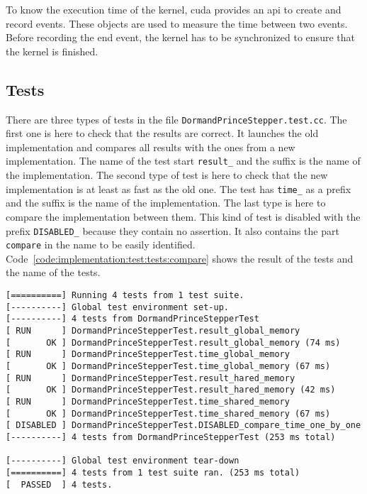 To know the execution time of the kernel, \acrshort{cuda} provides an \acrshort{api}
to create and record events.
These objects are used to measure the time between two events.
Before recording the end event, the kernel has to be synchronized to ensure
that the kernel is finished.

\subsection{Tests}
\label{ch:implementation:test:tests}

There are three types of tests in the file \texttt{DormandPrinceStepper.test.cc}.
The first one is here to check that the results are correct.
It launches the old implementation and compares all results with the ones from a
new implementation.
The name of the test start \texttt{result\_} and the suffix is the name of the
implementation.
The second type of test is here to check that the new implementation is
at least as fast as the old one.
The test has \texttt{time\_} as a prefix and the suffix is the name of the
implementation.
The last type is here to compare the implementation between them.
This kind of test is disabled with the prefix \texttt{DISABLED\_} because
they contain no assertion.
It also contains the part \texttt{compare} in the name to be easily identified.
Code~\ref{code:implementation:test:tests:compare} shows the result of the tests
and the name of the tests.

\begin{code}
    \label{code:implementation:test:tests:compare}
    \begin{verbatim}
[==========] Running 4 tests from 1 test suite.
[----------] Global test environment set-up.
[----------] 4 tests from DormandPrinceStepperTest
[ RUN      ] DormandPrinceStepperTest.result_global_memory
[       OK ] DormandPrinceStepperTest.result_global_memory (74 ms)
[ RUN      ] DormandPrinceStepperTest.time_global_memory
[       OK ] DormandPrinceStepperTest.time_global_memory (67 ms)
[ RUN      ] DormandPrinceStepperTest.result_hared_memory
[       OK ] DormandPrinceStepperTest.result_hared_memory (42 ms)
[ RUN      ] DormandPrinceStepperTest.time_shared_memory
[       OK ] DormandPrinceStepperTest.time_shared_memory (67 ms)
[ DISABLED ] DormandPrinceStepperTest.DISABLED_compare_time_one_by_one
[----------] 4 tests from DormandPrinceStepperTest (253 ms total)

[----------] Global test environment tear-down
[==========] 4 tests from 1 test suite ran. (253 ms total)
[  PASSED  ] 4 tests.
    \end{verbatim}
\end{code}




